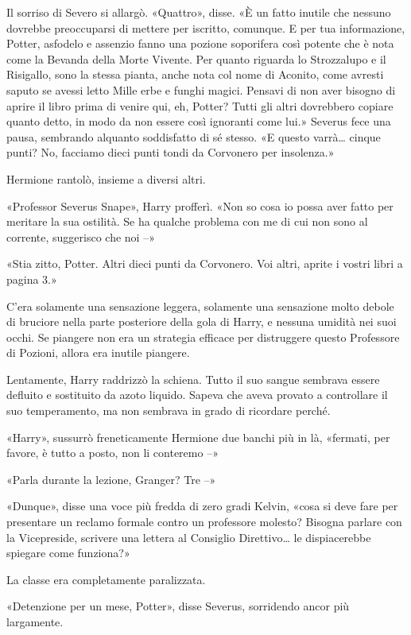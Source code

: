 Il sorriso di Severo si allargò. «Quattro», disse. «È un fatto inutile che nessuno dovrebbe preoccuparsi di mettere per iscritto, comunque. E per tua informazione, Potter, asfodelo e assenzio fanno una pozione soporifera così potente che è nota come la Bevanda della Morte Vivente. Per quanto riguarda lo Strozzalupo e il Risigallo, sono la stessa pianta, anche nota col nome di Aconito, come avresti saputo se avessi letto Mille erbe e funghi magici. Pensavi di non aver bisogno di aprire il libro prima di venire qui, eh, Potter? Tutti gli altri dovrebbero copiare quanto detto, in modo da non essere così ignoranti come lui.» Severus fece una pausa, sembrando alquanto soddisfatto di sé stesso. «E questo varrà… cinque punti? No, facciamo dieci punti tondi da Corvonero per insolenza.»

Hermione rantolò, insieme a diversi altri.

«Professor Severus Snape», Harry profferì. «Non so cosa io possa aver fatto per meritare la sua ostilità. Se ha qualche problema con me di cui non sono al corrente, suggerisco che noi –»

«Stia zitto, Potter. Altri dieci punti da Corvonero. Voi altri, aprite i vostri libri a pagina 3.»

C’era solamente una sensazione leggera, solamente una sensazione molto debole di bruciore nella parte posteriore della gola di Harry, e nessuna umidità nei suoi occhi. Se piangere non era un strategia efficace per distruggere questo Professore di Pozioni, allora era inutile piangere.

Lentamente, Harry raddrizzò la schiena. Tutto il suo sangue sembrava essere defluito e sostituito da azoto liquido. Sapeva che aveva provato a controllare il suo temperamento, ma non sembrava in grado di ricordare perché.

«Harry», sussurrò freneticamente Hermione due banchi più in là, «fermati, per favore, è tutto a posto, non li conteremo –»

«Parla durante la lezione, Granger? Tre –»

«Dunque», disse una voce più fredda di zero gradi Kelvin, «cosa si deve fare per presentare un reclamo formale contro un professore molesto? Bisogna parlare con la Vicepreside, scrivere una lettera al Consiglio Direttivo… le dispiacerebbe spiegare come funziona?»

La classe era completamente paralizzata.

«Detenzione per un mese, Potter», disse Severus, sorridendo ancor più largamente.

